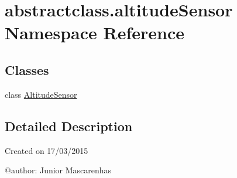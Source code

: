 \hypertarget{namespaceabstractclass_1_1altitudeSensor}{}\section{abstractclass.\+altitude\+Sensor Namespace Reference}
\label{namespaceabstractclass_1_1altitudeSensor}
\subsection*{Classes}
\begin{DoxyCompactItemize}
\item 
class \hyperlink{classabstractclass_1_1altitudeSensor_1_1AltitudeSensor}{Altitude\+Sensor}
\end{DoxyCompactItemize}


\subsection{Detailed Description}
\begin{DoxyVerb}Created on 17/03/2015

@author: Junior Mascarenhas
\end{DoxyVerb}
 